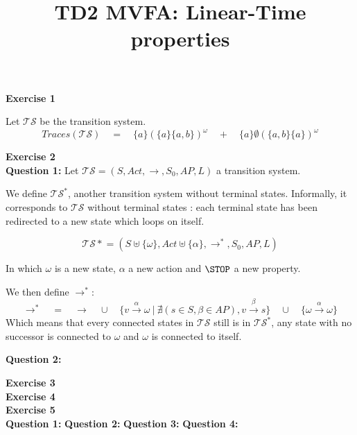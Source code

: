 \documentclass[11pt,a4paper]{article}
\title{TD2 MVFA: Linear-Time properties}
\date{}
\def\exercise#1{\Large\textbf{Exercise #1}\normalsize\\}
\def\question#1{\textbf{Question #1:}\quad}
\begin{document}
\maketitle

\exercise{1}
\def\seta{\{a\}}
\def\setab{\{a,b\}}


Let $\mathcal{TS}$ be the transition system.
$$\mathit{Traces}(\mathcal{TS})\quad=\quad\seta(\seta\setab)^\omega \quad+\quad \seta\emptyset(\setab\seta)^\omega$$

\exercise{2}
\question{1}
Let $\mathcal{TS}=(S,\mathit{Act},\rightarrow,S_0,\mathit{AP},L)$ a transition system.

We define $\mathcal{TS^*}$, another transition system without terminal states. Informally, it corresponds to $\mathcal{TS}$ without terminal states : each terminal state has been redirected to a new state which loops on itself.

$$\mathcal{TS*}=(S\uplus\{\omega\},\mathit{Act}\uplus\{\alpha\},\rightarrow^*,S_0,\mathit{AP},L)$$

In which $\omega$ is a new state, $\alpha$ a new action and $\STOP$ a new property.

We then define $\rightarrow^*$:
$$\rightarrow^*\quad=\quad\rightarrow\quad\cup\quad\{v\xrightarrow{\alpha} \omega~|~\nexists (s\in S, \beta\in\mathit{AP}), v\xrightarrow{\beta}s\}\quad\cup\quad\{\omega\xrightarrow{\alpha}\omega\}$$
Which means that every connected states in $\mathcal{TS}$ still is in $\mathcal{TS^*}$, any state with no successor is connected to $\omega$ and $\omega$ is connected to itself.


\question{2}

\exercise{3}

\exercise{4}

\exercise{5}
\question{1}
\question{2}
\question{3}
\question{4}
\end{document}

